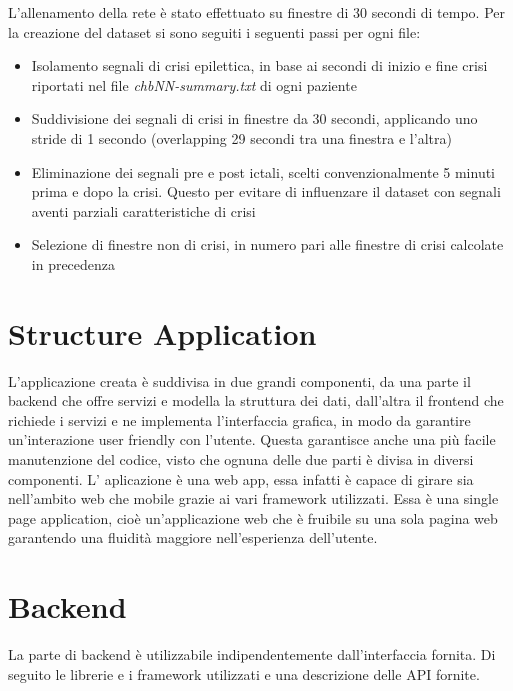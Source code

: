 \documentclass{article}
\begin{document}
L'allenamento della rete è stato effettuato su finestre di 30 secondi di tempo. Per la creazione del dataset si sono seguiti i seguenti passi per ogni file:
\begin{itemize}
\item Isolamento segnali di crisi epilettica, in base ai secondi di inizio e fine crisi riportati nel file \textit{chbNN-summary.txt} di ogni paziente
\item Suddivisione dei segnali di crisi in finestre da 30 secondi, applicando uno stride di 1 secondo (overlapping 29 secondi tra una finestra e l'altra)
\item Eliminazione dei segnali pre e post ictali, scelti convenzionalmente 5 minuti prima e dopo la crisi. Questo per evitare di influenzare il dataset con segnali aventi parziali caratteristiche di crisi
\item Selezione di finestre non di crisi, in numero pari alle finestre di crisi calcolate in precedenza
\end{itemize}
\section{Structure Application}
L'applicazione creata è suddivisa in due grandi componenti, da una parte il backend che offre servizi e modella la struttura dei dati, dall'altra il frontend che richiede i servizi e ne implementa l'interfaccia grafica, in modo da garantire un'interazione user friendly con l'utente.
Questa garantisce anche una più facile manutenzione del codice, visto che ognuna delle due parti è divisa in diversi componenti.
L' aplicazione è una web app, essa infatti è capace di girare sia nell'ambito web che mobile grazie ai vari framework utilizzati.
Essa è una single page application, cioè un'applicazione web che è fruibile su una sola pagina web garantendo una fluidità maggiore nell'esperienza dell'utente.
\section{Backend}
La parte di backend è utilizzabile indipendentemente dall'interfaccia fornita. Di seguito le librerie e i framework utilizzati e una descrizione delle API fornite. 
\end{document}
